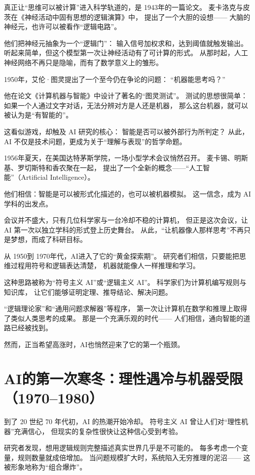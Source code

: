 真正让“思维可以被计算”进入科学轨道的，是 1943年的一篇论文。
麦卡洛克与皮茨在《神经活动中固有思想的逻辑演算》中，
提出了一个大胆的设想——
大脑的神经元，也许可以被看作“逻辑电路”。

他们把神经元抽象为一个“逻辑门”：
输入信号加权求和，达到阈值就触发输出。
听起来简单，但这个模型第一次让神经活动有了可计算的形式。
从那时起，人工神经网络不再只是隐喻，而有了数学意义上的雏形。

1950年，艾伦·图灵提出了一个至今仍在争论的问题：
“机器能思考吗？”

他在论文《计算机器与智能》中设计了著名的“图灵测试”。
测试的思想很简单：
如果一个人通过文字对话，无法分辨对方是人还是机器，
那么这台机器，就可以被认为是“有智能的”。

这看似游戏，却触及 AI 研究的核心：
智能是否可以被外部行为所判定？
从此，AI 不仅是技术问题，更成为关于“理解与表现”的哲学命题。

1956年夏天，在美国达特茅斯学院，一场小型学术会议悄然召开。
麦卡锡、明斯基、罗切斯特和香农聚在一起，
提出了一个全新的概念——“人工智能”（Artificial Intelligence）。

他们相信：智能是可以被形式化描述的，也可以被机器模拟。
这一信念，成为 AI 学科的出发点。

会议并不盛大，只有几位科学家与一台冷却不稳的计算机，
但正是这次会议，让 AI 第一次以独立学科的形式登上历史舞台。
从此，“让机器像人那样思考”不再只是梦想，而成了科研目标。

从 1950到 1970年代，AI进入了它的“黄金探索期”。
研究者们相信，只要能把思维过程用符号和逻辑表达清楚，
机器就能像人一样推理和学习。

这种思路被称为“符号主义 AI”或“逻辑主义 AI”。
科学家们为计算机编写规则与知识库，
让它们能够证明定理、推导结论、解决问题。

“逻辑理论家”和“通用问题求解器”等程序，
第一次让计算机在数学和推理上取得了类似人类思考的成果。
那是一个充满乐观的时代——
人们相信，通向智能的道路已经被找到。

然而，正当希望高涨时，AI也悄然迎来了它的第一个瓶颈。

\section{AI的第一次寒冬：理性遇冷与机器受限（1970–1980）}

到了 20 世纪 70 年代初，AI 的热潮开始冷却。
符号主义 AI 曾让人们对“理性机器”充满信心，
但现实的复杂性很快让这种信心受到考验。

研究者发现，想用逻辑规则完整描述真实世界几乎是不可能的。
每多考虑一个变量，规则数量就成倍增加。
当问题规模扩大时，系统陷入无穷推理的泥沼——
这被形象地称为“组合爆炸”。

